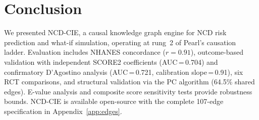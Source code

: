 \documentclass[runningheads]{llncs}
\begin{document}
\section{Conclusion}\label{sec:conclusion}

We presented NCD-CIE, a causal knowledge graph engine for NCD risk
prediction and what-if simulation, operating at rung~2 of Pearl's
causation ladder.
Evaluation includes NHANES concordance ($r = 0.91$), outcome-based
validation with independent SCORE2 coefficients (AUC\,=\,0.704)
and confirmatory D'Agostino analysis (AUC\,=\,0.721,
calibration slope\,=\,0.91), six RCT comparisons, and structural
validation via the PC algorithm (64.5\% shared edges).
E-value analysis and composite score sensitivity tests provide
robustness bounds.
NCD-CIE is available open-source with the complete 107-edge
specification in Appendix~\ref{app:edges}.
\end{document}
